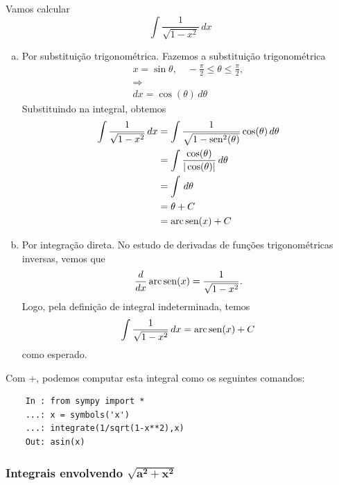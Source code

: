 \begin{ex}
  Vamos calcular
  \begin{equation}
    \int \frac{1}{\sqrt{1 - x^2}}\,dx
  \end{equation}
  \begin{enumerate}[a)]
  \item Por substituição trigonométrica.
    Fazemos a substituição trigonométrica
    \begin{gather}
      x = \sin\theta,\quad -\frac{\pi}{2}\leq\theta\leq\frac{\pi}{2},\\
      \Rightarrow\\
      dx = \cos(\theta)\,d\theta
    \end{gather}
    Substituindo na integral, obtemos
    \begin{align}
      \int \frac{1}{\sqrt{1 - x^2}}\,dx &= \int \frac{1}{\sqrt{1 - \operatorname{sen}^2(\theta)}}\cos(\theta)\,d\theta\\
                                        &= \int \frac{\cos(\theta)}{|\cos(\theta)|}\,d\theta\\
                                        &= \int\,d\theta\\
                                        &= \theta + C\\
                                        &= \operatorname{arc}\operatorname{sen}(x) + C
    \end{align}
  \item Por integração direta.
    No estudo de derivadas de funções trigonométricas inversas, vemos que
    \begin{equation}
      \frac{d}{dx}\operatorname{arc}\operatorname{sen}(x) = \frac{1}{\sqrt{1-x^2}}.
    \end{equation}
    Logo, pela definição de integral indeterminada, temos
    \begin{equation}
      \int\frac{1}{\sqrt{1-x^2}}\,dx = \operatorname{arc}\operatorname{sen}(x) + C
    \end{equation}
    como esperado.
  \end{enumerate}

  \ifispython
  Com {\python}+{\sympy}, podemos computar esta integral como os seguintes comandos:
  \begin{lstlisting}
    In : from sympy import *
    ...: x = symbols('x')
    ...: integrate(1/sqrt(1-x**2),x)
    Out: asin(x)
  \end{lstlisting}
  \fi
\end{ex}

\subsubsection{Integrais envolvendo $\pmb{\sqrt{a^2 + x^2}}$}

